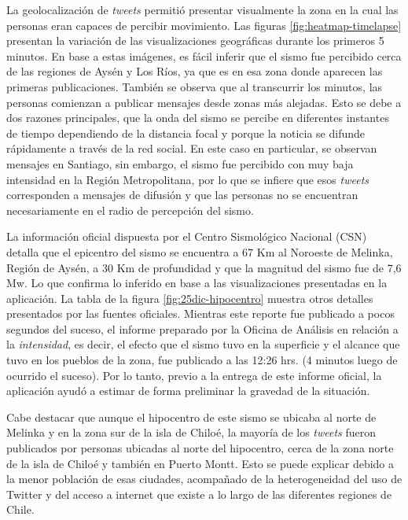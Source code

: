 	La geolocalización de \textit{tweets} permitió presentar visualmente la zona en la cual las personas eran capaces de percibir movimiento. Las figuras \ref{fig:heatmap-timelapse} presentan la variación de las visualizaciones geográficas durante los primeros 5 minutos. En base a estas imágenes, es fácil inferir que el sismo fue percibido cerca de las regiones de Aysén y Los Ríos, ya que es en esa zona donde aparecen las primeras publicaciones. También se observa que al transcurrir los minutos, las personas comienzan a publicar mensajes desde zonas más alejadas. Esto se debe a dos razones principales, que la onda del sismo se percibe en diferentes instantes de tiempo dependiendo de la distancia focal y porque la noticia se difunde rápidamente a través de la red social. En este caso en particular, se observan mensajes en Santiago, sin embargo, el sismo fue percibido con muy baja intensidad en la Región Metropolitana, por lo que se infiere que esos \textit{tweets} corresponden a mensajes de difusión y que las personas no se encuentran necesariamente en el radio de percepción del sismo.
		
	La información oficial dispuesta por el Centro Sismológico Nacional (CSN) detalla que el epicentro del sismo se encuentra a 67 Km al Noroeste de Melinka, Región de Aysén, a 30 Km de profundidad y que la magnitud del sismo fue de 7,6 Mw. Lo que confirma lo inferido en base a las visualizaciones presentadas en la aplicación. La tabla de la figura \ref{fig:25dic-hipocentro} muestra otros detalles presentados por las fuentes oficiales. 
	Mientras este reporte fue publicado a pocos segundos del suceso, el informe preparado por la Oficina de Análisis en relación a la {\em intensidad}, es decir, el efecto que el sismo tuvo en la superficie y el alcance que tuvo en los pueblos de la zona, fue publicado a las 12:26 hrs. (4 minutos luego de ocurrido el suceso).
	Por lo tanto, previo a la entrega de este informe oficial, la aplicación ayudó a estimar de forma preliminar la gravedad de la situación. 
	
	
Cabe destacar que aunque el hipocentro de este sismo se ubicaba al norte de Melinka y en la zona sur de la isla de Chiloé, la mayoría de los \textit{tweets} fueron publicados por personas ubicadas al norte del hipocentro, cerca de la zona norte de la isla de Chiloé y también en Puerto Montt. Esto se puede explicar debido a la menor población de esas ciudades, acompañado de la heterogeneidad del uso de Twitter y del acceso a internet que existe a lo largo de las diferentes regiones de Chile.
	

